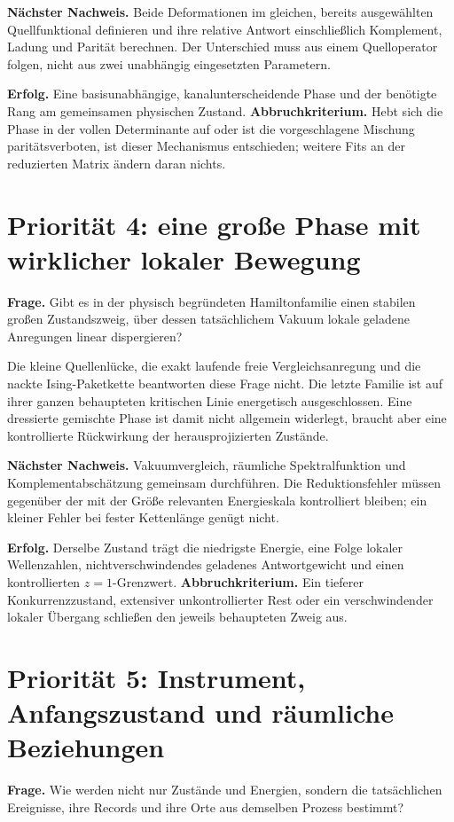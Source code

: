 \textbf{Nächster Nachweis.} Beide Deformationen im gleichen, bereits ausgewählten Quellfunktional definieren und ihre relative Antwort einschließlich Komplement, Ladung und Parität berechnen. Der Unterschied muss aus einem Quelloperator folgen, nicht aus zwei unabhängig eingesetzten Parametern.

\textbf{Erfolg.} Eine basisunabhängige, kanalunterscheidende Phase und der benötigte Rang am gemeinsamen physischen Zustand. \textbf{Abbruchkriterium.} Hebt sich die Phase in der vollen Determinante auf oder ist die vorgeschlagene Mischung paritätsverboten, ist dieser Mechanismus entschieden; weitere Fits an der reduzierten Matrix ändern daran nichts.

\section{Priorität 4: eine große Phase mit wirklicher lokaler Bewegung}
\textbf{Frage.} Gibt es in der physisch begründeten Hamiltonfamilie einen stabilen großen Zustandszweig, über dessen tatsächlichem Vakuum lokale geladene Anregungen linear dispergieren?

Die kleine Quellenlücke, die exakt laufende freie Vergleichsanregung und die nackte Ising-Paketkette beantworten diese Frage nicht. Die letzte Familie ist auf ihrer ganzen behaupteten kritischen Linie energetisch ausgeschlossen. Eine dressierte gemischte Phase ist damit nicht allgemein widerlegt, braucht aber eine kontrollierte Rückwirkung der herausprojizierten Zustände.

\textbf{Nächster Nachweis.} Vakuumvergleich, räumliche Spektralfunktion und Komplementabschätzung gemeinsam durchführen. Die Reduktionsfehler müssen gegenüber der mit der Größe relevanten Energieskala kontrolliert bleiben; ein kleiner Fehler bei fester Kettenlänge genügt nicht.

\textbf{Erfolg.} Derselbe Zustand trägt die niedrigste Energie, eine Folge lokaler Wellenzahlen, nichtverschwindendes geladenes Antwortgewicht und einen kontrollierten $z=1$-Grenzwert. \textbf{Abbruchkriterium.} Ein tieferer Konkurrenzzustand, extensiver unkontrollierter Rest oder ein verschwindender lokaler Übergang schließen den jeweils behaupteten Zweig aus.

\section{Priorität 5: Instrument, Anfangszustand und räumliche Beziehungen}
\textbf{Frage.} Wie werden nicht nur Zustände und Energien, sondern die tatsächlichen Ereignisse, ihre Records und ihre Orte aus demselben Prozess bestimmt?

